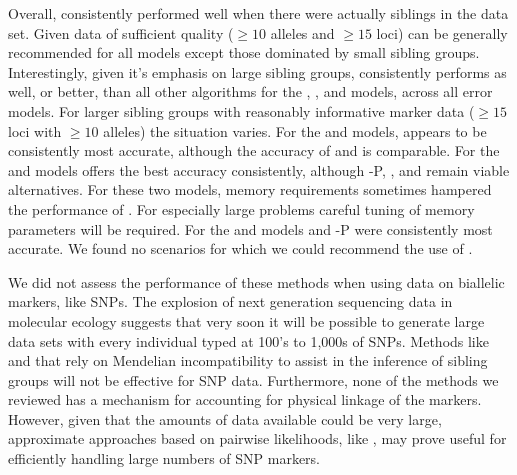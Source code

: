 Overall, \colony{} consistently performed well when
there were actually siblings in the data set.  
Given data of sufficient quality ($\geq 10$ alleles and $\geq 15$ loci)
\prt{} can be generally recommended for 
all models except those dominated by small sibling groups. Interestingly, given it's emphasis on large 
sibling groups, \prt{} consistently performs as well, or better, than all other algorithms for the \nosibs{}, 
\allhalf{}, and \allpathalf{} models, across all error models. 
For larger sibling groups with reasonably informative marker data
($\geq 15$ loci with $\geq 10$ alleles) the situation varies. For 
the \onelargenoh{} and \onelargewh{} models, \prt{} appears to be consistently 
most accurate, although the accuracy of \colony{} 
and \familyfinder{} is comparable. For the \slfsgnoh{} and \slfsgwh{} models \colony{} offers the best accuracy consistently, although 
\colony-P, \prt, and \familyfinder{} remain viable alternatives. For these two models, memory requirements sometimes hampered the 
performance of \prt{}. For especially large problems careful tuning of memory parameters will be required. 
For the \sfsnoh{} and  \sfswh{} models \colony{} and \colony-P were consistently most accurate.   
We found no scenarios for which we could recommend the use of \kinalyzer{}.

We did not assess the performance of these methods when using data on biallelic
markers, like SNPs.  The explosion of next generation sequencing data 
in molecular ecology suggests that very soon it will be possible to 
generate large data sets with every individual typed at 100's to 1,000s
of SNPs.  Methods like \prt{} and \kinalyzer{} that rely on Mendelian 
incompatibility to assist in the inference of sibling groups will not
be effective for SNP data. Furthermore, none of the methods we reviewed 
has a mechanism for accounting for physical linkage of the markers.
However, given that the amounts of data available
could be very large, approximate approaches based on pairwise likelihoods,
like \familyfinder{}, may prove useful for efficiently handling 
large numbers of SNP markers.





